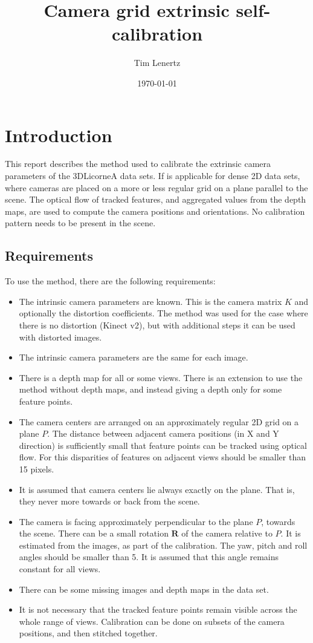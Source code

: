 \documentclass{scrreprt}
\title{Camera grid extrinsic self-calibration}
\author{Tim Lenertz}
\date{\today}
\newcommand{\matr}[1]{\mathbf{#1}}
\begin{document}
\maketitle

\tableofcontents

\chapter{Introduction}
This report describes the method used to calibrate the extrinsic camera parameters of the 3DLicorneA data sets. If is applicable for dense 2D data sets, where cameras are placed on a more or less regular grid on a plane parallel to the scene. The optical flow of tracked features, and aggregated values from the depth maps, are used to compute the camera positions and orientations. No calibration pattern needs to be present in the scene.

\section{Requirements}
To use the method, there are the following requirements:
\begin{itemize}
\item The intrinsic camera parameters are known. This is the camera matrix $K$ and optionally the distortion coefficients. The method was used for the case where there is no distortion (Kinect v2), but with additional steps it can be used with distorted images.
\item The intrinsic camera parameters are the same for each image.
\item There is a depth map for all or some views. There is an extension to use the method without depth maps, and instead giving a depth only for some feature points.
\item The camera centers are arranged on an approximately regular 2D grid on a plane $P$. The distance between adjacent camera positions (in X and Y direction) is sufficiently small that feature points can be tracked using optical flow. For this disparities of features on adjacent views should be smaller than 15 pixels.
\item It is assumed that camera centers lie always exactly on the plane. That is, they never more towards or back from the scene. 
\item The camera is facing approximately perpendicular to the plane $P$, towards the scene. There can be a small rotation $\matr{R}$ of the camera relative to $P$. It is estimated from the images, as part of the calibration. The yaw, pitch and roll angles should be smaller than 5\textdegree. It is assumed that this angle remains constant for all views.
\item There can be some missing images and depth maps in the data set.
\item It is not necessary that the tracked feature points remain visible across the whole range of views. Calibration can be done on subsets of the camera positions, and then stitched together.
\end{itemize}
\end{document}

